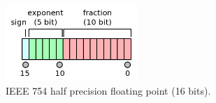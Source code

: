 \documentclass[logo,bsc,singlespacing,parskip]{infthesis}
\begin{document}
\begin{figure}
    \begin{center}
    \includegraphics[width=50mm,scale=0.1]{image/ieee-f16.png}
    \end{center}
    \caption{IEEE 754 half precision floating point (16 bits).~\cite{ieee754-diagram}}
    \label{fig:ieee-f16}
\end{figure}












\end{document}
